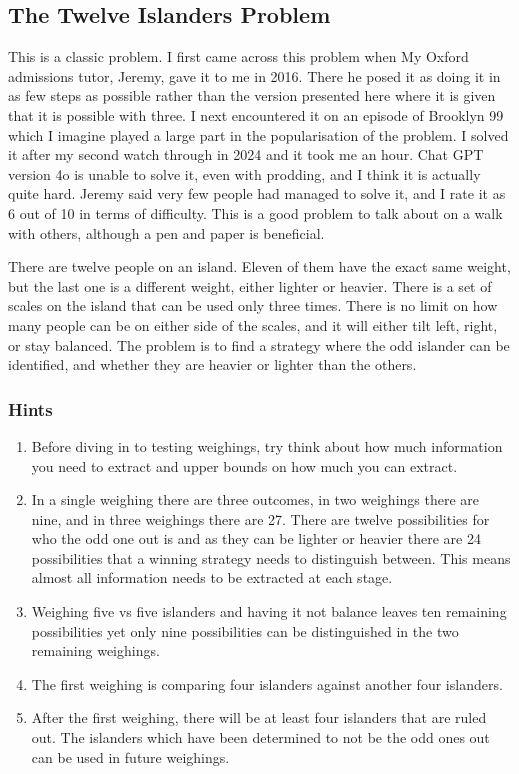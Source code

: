 
\subsection{The Twelve Islanders Problem}

This is a classic problem. I first came across this problem when My Oxford admissions tutor, Jeremy, gave it to me in 2016. There he posed it as doing it in as few steps as possible rather than the version presented here where it is given that it is possible with three. I next encountered it on an episode of Brooklyn 99 which I imagine played a large part in the popularisation of the problem. I solved it after my second watch through in 2024 and it took me an hour. Chat GPT version 4o is unable to solve it, even with prodding, and I think it is actually quite hard. Jeremy said very few people had managed to solve it, and I rate it as 6 out of 10 in terms of difficulty. This is a good problem to talk about on a walk with others, although a pen and paper is beneficial.

There are twelve people on an island. Eleven of them have the exact same weight, but the last one is a different weight, either lighter or heavier. There is a set of scales on the island that can be used only three times. There is no limit on how many people can be on either side of the scales, and it will either tilt left, right, or stay balanced. The problem is to find a strategy where the odd islander can be identified, and whether they are heavier or lighter than the others.

\subsubsection{Hints}

\begin{enumerate}
	\item Before diving in to testing weighings, try think about how much information you need to extract and upper bounds on how much you can extract.
	\item In a single weighing there are three outcomes, in two weighings there are nine, and in three weighings there are 27. There are twelve possibilities for who the odd one out is and as they can be lighter or heavier there are 24 possibilities that a winning strategy needs to distinguish between. This means almost all information needs to be extracted at each stage.
	\item Weighing five vs five islanders and having it not balance leaves ten remaining possibilities yet only nine possibilities can be distinguished in the two remaining weighings.
    \item The first weighing is comparing four islanders against another four islanders.
    \item After the first weighing, there will be at least four islanders that are ruled out. The islanders which have been determined to not be the odd ones out can be used in future weighings.
\end{enumerate}

